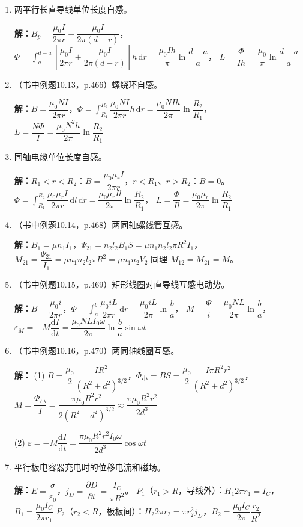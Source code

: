 \documentclass{ctexart}
\begin{document}
\begin{enumerate}
\item 两平行长直导线单位长度自感。

\textbf{解：}$B_p = \dfrac{\mu_0 I}{2\pi r} + \dfrac{\mu_0 I}{2\pi(d-r)}$，
$\Phi = \displaystyle\int_a^{d-a} \left[\dfrac{\mu_0 I}{2\pi r} + \dfrac{\mu_0 I}{2\pi(d-r)}\right]h\,\mathrm{d}r = \dfrac{\mu_0 I h}{\pi}\ln\dfrac{d-a}{a}$，
$L = \dfrac{\Phi}{Ih} = \dfrac{\mu_0}{\pi}\ln\dfrac{d-a}{a}$

\item（书中例题10.13，p.466）螺绕环自感。

\textbf{解：}$B = \dfrac{\mu_0 NI}{2\pi r}$，$\Phi = \displaystyle\int_{R_1}^{R_2} \dfrac{\mu_0 NI}{2\pi r}h\,\mathrm{d}r = \dfrac{\mu_0 NI h}{2\pi}\ln\dfrac{R_2}{R_1}$，
$L = \dfrac{N\Phi}{I} = \dfrac{\mu_0 N^{2}h}{2\pi}\ln\dfrac{R_2}{R_1}$

\item 同轴电缆单位长度自感。

\textbf{解：}$R_1 < r < R_2$：$B = \dfrac{\mu_0\mu_r I}{2\pi r}$，$r < R_1$、$r > R_2$：$B = 0$。
$\Phi = \displaystyle\int_{R_1}^{R_2} \dfrac{\mu_0\mu_r I}{2\pi r}\,\mathrm{d}l\,\mathrm{d}r = \dfrac{\mu_0\mu_r I l}{2\pi}\ln\dfrac{R_2}{R_1}$，
$L = \dfrac{\Phi}{Il} = \dfrac{\mu_0\mu_r}{2\pi}\ln\dfrac{R_2}{R_1}$

\item（书中例题10.14，p.468）两同轴螺线管互感。

\textbf{解：}$B_1 = \mu n_1 I_1$，$\Psi_{21} = n_2 l_2 B_1 S = \mu n_1 n_2 l_2 \pi R^{2}I_1$，
$M_{21} = \dfrac{\Psi_{21}}{I_1} = \mu n_1 n_2 l_2 \pi R^{2} = \mu n_1 n_2 V_2$
同理 $M_{12} = M_{21} = M$。

\item（书中例题10.15，p.469）矩形线圈对直导线互感电动势。

\textbf{解：}$B = \dfrac{\mu_0 i}{2\pi r}$，$\Phi = \displaystyle\int_a^b \dfrac{\mu_0 i L}{2\pi r}\,\mathrm{d}r = \dfrac{\mu_0 i L}{2\pi}\ln\dfrac{b}{a}$，
$M = \dfrac{\Psi}{i} = \dfrac{\mu_0 NL}{2\pi}\ln\dfrac{b}{a}$，
$\varepsilon_M = -M\dfrac{\mathrm{d}I}{\mathrm{d}t} = \dfrac{\mu_0 N L I_0\omega}{2\pi}\ln\dfrac{b}{a}\sin\omega t$

\item（书中例题10.16，p.470）两同轴线圈互感。

\textbf{解：}
(1) $B = \dfrac{\mu_0}{2}\dfrac{IR^{2}}{(R^{2}+d^{2})^{3/2}}$，$\Phi_{\text{小}} = BS = \dfrac{\mu_0}{2}\dfrac{I\pi R^{2}r^{2}}{(R^{2}+d^{2})^{3/2}}$，
$M = \dfrac{\Phi_{\text{小}}}{I} = \dfrac{\pi\mu_0 R^{2}r^{2}}{2(R^{2}+d^{2})^{3/2}} \approx \dfrac{\pi\mu_0 R^{2}r^{2}}{2d^{3}}$

(2) $\varepsilon = -M\dfrac{\mathrm{d}I}{\mathrm{d}t} = \dfrac{\pi\mu_0 R^{2}r^{2}I_0\omega}{2d^{3}}\cos\omega t$

\item 平行板电容器充电时的位移电流和磁场。

\textbf{解：}$E = \dfrac{\sigma}{\varepsilon_0}$，$j_D = \dfrac{\partial D}{\partial t} = \dfrac{I_C}{\pi R^{2}}$。
$P_1$（$r_1 > R$，导线外）：$H_1 2\pi r_1 = I_C$，$B_1 = \dfrac{\mu_0 I_C}{2\pi r_1}$
$P_2$（$r_2 < R$，极板间）：$H_2 2\pi r_2 = \pi r_2^{2} j_D$，$B_2 = \dfrac{\mu_0 I_C}{2\pi}\dfrac{r_2}{R^{2}}$

\end{enumerate}
\end{document}

